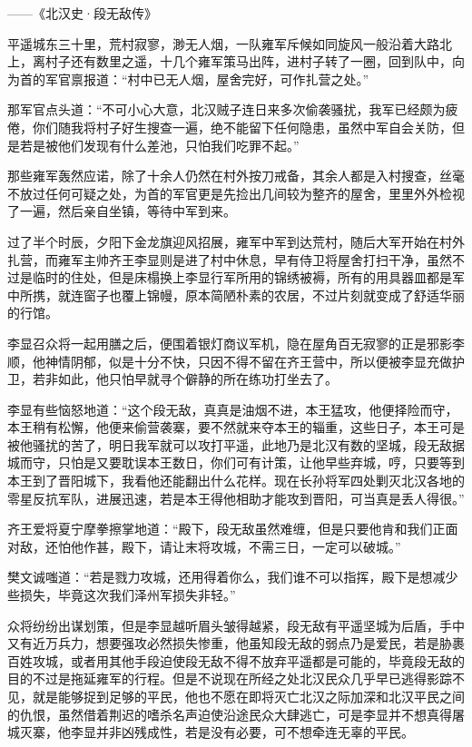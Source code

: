 ——《北汉史·段无敌传》

平遥城东三十里，荒村寂寥，渺无人烟，一队雍军斥候如同旋风一般沿着大路北上，离村子还有数里之遥，十几个雍军策马出阵，进村子转了一圈，回到队中，向为首的军官禀报道：“村中已无人烟，屋舍完好，可作扎营之处。”

那军官点头道：“不可小心大意，北汉贼子连日来多次偷袭骚扰，我军已经颇为疲倦，你们随我将村子好生搜查一遍，绝不能留下任何隐患，虽然中军自会关防，但是若是被他们发现有什么差池，只怕我们吃罪不起。”

那些雍军轰然应诺，除了十余人仍然在村外按刀戒备，其余人都是入村搜查，丝毫不放过任何可疑之处，为首的军官更是先捡出几间较为整齐的屋舍，里里外外检视了一遍，然后亲自坐镇，等待中军到来。

过了半个时辰，夕阳下金龙旗迎风招展，雍军中军到达荒村，随后大军开始在村外扎营，而雍军主帅齐王李显则是进了村中休息，早有侍卫将屋舍打扫干净，虽然不过是临时的住处，但是床榻换上李显行军所用的锦绣被褥，所有的用具器皿都是军中所携，就连窗子也覆上锦幔，原本简陋朴素的农居，不过片刻就变成了舒适华丽的行馆。

李显召众将一起用膳之后，便围着银灯商议军机，隐在屋角百无寂寥的正是邪影李顺，他神情阴郁，似是十分不快，只因不得不留在齐王营中，所以便被李显充做护卫，若非如此，他只怕早就寻个僻静的所在练功打坐去了。

李显有些恼怒地道：“这个段无敌，真真是油烟不进，本王猛攻，他便择险而守，本王稍有松懈，他便来偷营袭寨，要不然就来夺本王的辎重，这些日子，本王可是被他骚扰的苦了，明日我军就可以攻打平遥，此地乃是北汉有数的坚城，段无敌据城而守，只怕是又要耽误本王数日，你们可有计策，让他早些弃城，哼，只要等到本王到了晋阳城下，我看他还能翻出什么花样。现在长孙将军四处剿灭北汉各地的零星反抗军队，进展迅速，若是本王得他相助才能攻到晋阳，可当真是丢人得很。”

齐王爱将夏宁摩拳擦掌地道：“殿下，段无敌虽然难缠，但是只要他肯和我们正面对敌，还怕他作甚，殿下，请让末将攻城，不需三日，一定可以破城。”

樊文诚嗤道：“若是戮力攻城，还用得着你么，我们谁不可以指挥，殿下是想减少些损失，毕竟这次我们泽州军损失非轻。”

众将纷纷出谋划策，但是李显越听眉头皱得越紧，段无敌有平遥坚城为后盾，手中又有近万兵力，想要强攻必然损失惨重，他虽知段无敌的弱点乃是爱民，若是胁裹百姓攻城，或者用其他手段迫使段无敌不得不放弃平遥都是可能的，毕竟段无敌的目的不过是拖延雍军的行程。但是不说现在所经之处北汉民众几乎早已逃得影踪不见，就是能够捉到足够的平民，他也不愿在即将灭亡北汉之际加深和北汉平民之间的仇恨，虽然借着荆迟的嗜杀名声迫使沿途民众大肆逃亡，可是李显并不想真得屠城灭寨，他李显并非凶残成性，若是没有必要，可不想牵连无辜的平民。

